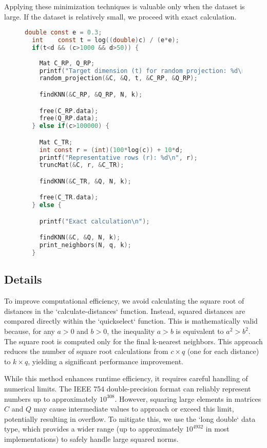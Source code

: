 \documentclass{article}
\begin{document}
Applying these minimization techniques is valuable only when the dataset is large. If the dataset is relatively small, we proceed with exact calculation.


\begin{figure}[H]
\begin{lstlisting}[language=C, caption={Approximation Check}]
  double const e = 0.3;
  int    const t = log((double)c) / (e*e);
  if(t<d && (c>1000 && d>50)) {
    
    Mat C_RP, Q_RP;
    printf("Target dimension (t) for random projection: %d\n", t);
    random_projection(&C, &Q, t, &C_RP, &Q_RP);

    findKNN(&C_RP, &Q_RP, N, k); 

    free(C_RP.data);
    free(Q_RP.data);
  } else if(c>100000) {

    Mat C_TR;
    int const r = (int)(100*log(c)) + 10*d;
    printf("Representative rows (r): %d\n", r);
    truncMat(&C, r, &C_TR);

    findKNN(&C_TR, &Q, N, k);

    free(C_TR.data);
  } else {

    printf("Exact calculation\n");

    findKNN(&C, &Q, N, k); 
    print_neighbors(N, q, k);
  }
\end{lstlisting}
\end{figure}

\subsection{Details}
To improve computational efficiency, we avoid calculating the square root of distances in the `calculate-distances` function. Instead, squared distances are compared directly within the `quickselect` function. This is mathematically valid because, for any \( a > 0 \) and \( b > 0 \), the inequality \( a > b \) is equivalent to \( a^2 > b^2 \). The square root is computed only for the final k-nearest neighbors. This approach reduces the number of square root calculations from \( c \times q \) (one for each distance) to \( k \times q \), yielding a significant performance improvement.

While this method enhances runtime efficiency, it requires careful handling of numerical limits. The IEEE 754 double-precision format can reliably represent numbers up to approximately \( 10^{308} \). However, squaring large elements in matrices \( C \) and \( Q \) may cause intermediate values to approach or exceed this limit, potentially resulting in overflow. To mitigate this, we use the `long double` data type, which provides a wider range (up to approximately \( 10^{4932} \) in most implementations) to safely handle large squared norms.
\end{document}
